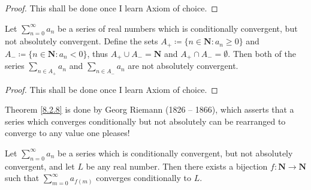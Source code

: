 \begin{proof}
This shall be done once I learn Axiom of choice.
\end{proof}

\begin{lemma}\label{8.2.7}
Let \(\sum_{n = 0}^\infty a_n\) be a series of real numbers which is conditionally convergent, but not absolutely convergent.
Define the sets \(A_+ \coloneqq \{n \in \mathbf{N} : a_n \geq 0\}\) and \(A_- \coloneqq \{n \in \mathbf{N} : a_n < 0\}\), thus \(A_+ \cup A_- = \mathbf{N}\) and \(A_+ \cap A_- = \emptyset\).
Then both of the series \(\sum_{n \in A_+} a_n\) and \(\sum_{n \in A_-} a_n\) are not absolutely convergent.
\end{lemma}

\begin{proof}
This shall be done once I learn Axiom of choice.
\end{proof}

\begin{note}
Theorem \ref{8.2.8} is done by Georg Riemann (1826 -- 1866), which asserts that a series which converges conditionally but not absolutely can be rearranged to converge to any value one pleases!
\end{note}

\begin{theorem}\label{8.2.8}
Let \(\sum_{n = 0}^\infty a_n\) be a series which is conditionally convergent, but not absolutely convergent, and let \(L\) be any real number.
Then there exists a bijection \(f : \mathbf{N} \to \mathbf{N}\) such that \(\sum_{m = 0}^\infty a_{f(m)}\) converges conditionally to \(L\).
\end{theorem}

